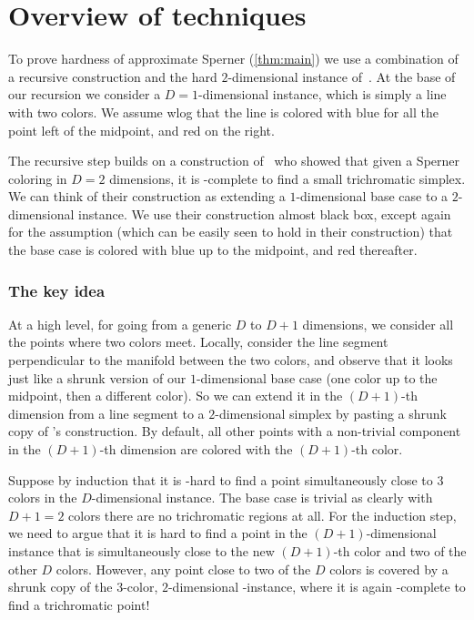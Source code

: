 \documentclass[letterpaper,11pt]{article}
\begin{document}
\section{Overview of techniques}
To prove hardness of approximate Sperner (\cref{thm:main}) we use a combination of a recursive construction and the hard $2$-dimensional instance of~\cite{DBLP:journals/tcs/ChenD09}.
At the base of our recursion we consider a $D=1$-dimensional instance, which is simply a line with two colors.  We assume wlog that the line is colored with blue for all the point left of the midpoint, and red on the right. 

The recursive step builds on a construction of~\cite{DBLP:journals/tcs/ChenD09} who showed that given a Sperner coloring in $D=2$ dimensions, it is \PPAD-complete to find a small trichromatic simplex. We can think of their construction as extending a $1$-dimensional base case to a $2$-dimensional instance. We use their construction almost black box, except again for the assumption (which can be easily seen to hold in their construction) that the base case is colored with blue up to the midpoint, and red thereafter. 

\subsubsection*{The key idea}

At a high level, for going from a generic $D$ to $D+1$ dimensions, we consider all the points where two colors meet. Locally, consider the line segment perpendicular to the manifold between the two colors, and observe that it looks just like a shrunk version of our $1$-dimensional base case (one color up to the midpoint, then a different color). So we can extend it in the $(D+1)$-th dimension from a line segment to a $2$-dimensional simplex by pasting a shrunk copy of \cite{DBLP:journals/tcs/ChenD09}'s construction. By default, all other points with a non-trivial component in the $(D+1)$-th dimension are colored with the $(D+1)$-th color. 

Suppose by induction that it is \PPAD-hard to find a point simultaneously close to $3$ colors in the $D$-dimensional instance. The base case is trivial as clearly with $D+1 = 2$ colors there are no trichromatic regions at all. For the induction step, we need to argue that it is hard to find a point in the $(D+1)$-dimensional instance that is simultaneously close to the new $(D+1)$-th color and two of the other $D$ colors. However, any point close to two of the $D$ colors is covered by a shrunk copy of the $3$-color, $2$-dimensional \cite{DBLP:journals/tcs/ChenD09}-instance, where it is again \PPAD-complete to find a trichromatic point!
\end{document}
